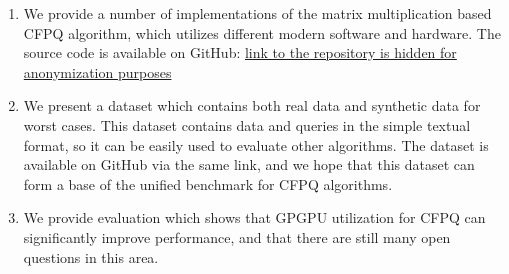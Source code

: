 \begin{enumerate}
\item We provide a number of implementations of the matrix multiplication based CFPQ algorithm, which utilizes different modern software and hardware.
The source code is available on GitHub: \href{link to the repository is hidden for anonymization purposes}{link to the repository is hidden for anonymization purposes}
\item We present a dataset which contains both real data and synthetic data for worst cases.
This dataset contains data and queries in the simple textual format, so it can be easily used to evaluate other algorithms.
The dataset is available on GitHub via the same link, and we hope that this dataset can form a base of the unified benchmark for CFPQ algorithms.
\item We provide evaluation which shows that GPGPU utilization for CFPQ can significantly improve performance, and that there are still many open questions in this area.
\end{enumerate}
